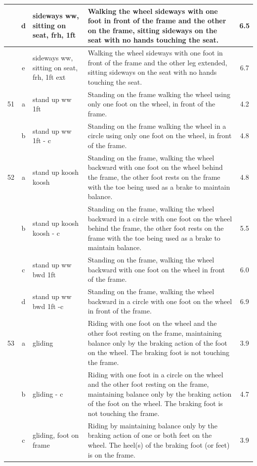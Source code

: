 \begin{longtable}{|r|c|p{4cm}|p{8cm}|c|}
\hline
  & d & sideways ww, sitting on seat, frh, 1ft  & Walking the wheel sideways with one foot in front of the frame and the other on the frame, sitting sideways on the seat with no hands touching the seat.  & 6.5 \\ 
\hline
  & e & sideways ww, sitting on seat, frh, 1ft ext  & Walking the wheel sideways with one foot in front of the frame and the other leg extended, sitting sideways on the seat with no hands touching the seat.  & 6.7 \\ 
\hline
51  & a & stand up ww 1ft & Standing on the frame walking the wheel using only one foot on the wheel, in front of the frame.  & 4.2 \\ 
\hline
  & b & stand up ww 1ft - c & Standing on the frame walking the wheel in a circle using only one foot on the wheel, in front of the frame.  & 4.8 \\ 
\hline
52  & a & stand up koosh koosh  & Standing on the frame, walking the wheel backward with one foot on the wheel behind the frame, the other foot rests on the frame with the toe being used as a brake to maintain balance.  & 4.8 \\ 
\hline
  & b & stand up koosh koosh - c  & Standing on the frame, walking the wheel backward in a circle with one foot on the wheel behind the frame, the other foot rests on the frame with the toe being used as a brake to maintain balance.  & 5.5 \\ 
\hline
  & c & stand up ww bwd 1ft & Standing on the frame, walking the wheel backward with one foot on the wheel in front of the frame. & 6.0 \\ 
\hline
  & d & stand up ww bwd 1ft -c  & Standing on the frame, walking the wheel backward in a circle with one foot on the wheel in front of the frame. & 6.9 \\ 
\hline
53  & a & gliding & Riding with one foot on the wheel and the other foot resting on the frame, maintaining balance only by the braking action of the foot on the wheel. The braking foot is not touching the frame. & 3.9 \\ 
\hline
  & b & gliding - c & Riding with one foot in a circle on the wheel and the other foot resting on the frame, maintaining balance only by the braking action of the foot on the wheel. The braking foot is not touching the frame. & 4.7 \\ 
\hline
  & c & gliding, foot on frame  & Riding by maintaining balance only by the braking action of one or both feet on the wheel. The heel(s) of the braking foot (or feet) is on the frame. & 3.9 \\ 

\end{longtable}
